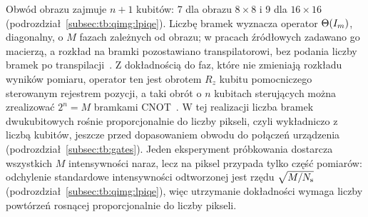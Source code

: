 Obwód obrazu zajmuje $n+1$ kubitów: 7 dla obrazu $8\times8$ i 9 dla $16\times16$ (podrozdział~\ref{subsec:tb:qimg:lpiqe}).
Liczbę bramek wyznacza operator $\Theta(I_m)$, diagonalny, o $M$ fazach zależnych od obrazu; w pracach źródłowych zadawano go macierzą, a rozkład na bramki pozostawiano transpilatorowi, bez podania liczby bramek po transpilacji~\cite{werner_data_loss_2023,werner_error_reduction_2025}.
Z dokładnością do faz, które nie zmieniają rozkładu wyników pomiaru, operator ten jest obrotem $R_z$ kubitu pomocniczego sterowanym rejestrem pozycji, a taki obrót o $n$ kubitach sterujących można zrealizować $2^{n}=M$ bramkami CNOT~\cite{shende_synthesis_2006}.
W tej realizacji liczba bramek dwukubitowych rośnie proporcjonalnie do liczby pikseli, czyli wykładniczo z liczbą kubitów, jeszcze przed dopasowaniem obwodu do połączeń urządzenia (podrozdział~\ref{subsec:tb:gates}).
Jeden eksperyment próbkowania dostarcza wszystkich $M$ intensywności naraz, lecz na piksel przypada tylko część pomiarów: odchylenie standardowe intensywności odtworzonej jest rzędu $\sqrt{M/N_{\mathrm{s}}}$ (podrozdział~\ref{subsec:tb:qimg:lpiqe}), więc utrzymanie dokładności wymaga liczby powtórzeń rosnącej proporcjonalnie do liczby pikseli.

